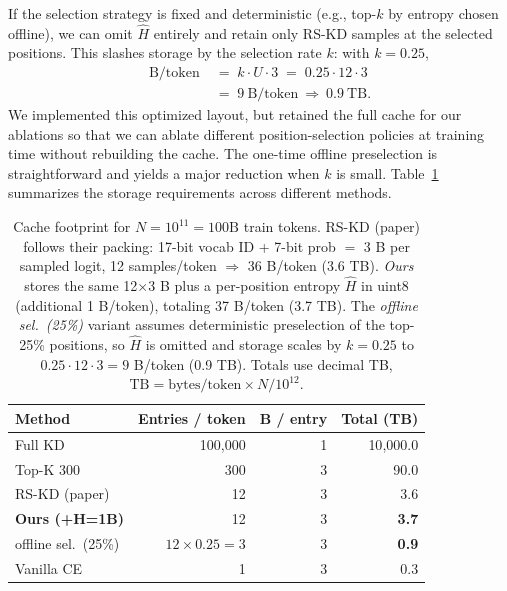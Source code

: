 \documentclass[11pt]{article}
\begin{document}
If the selection strategy is fixed and deterministic (e.g., top-$k$ by entropy chosen offline), we can omit $\hat H$ entirely and retain only RS-KD samples at the selected positions. This slashes storage by the selection rate $k$: with $k{=}0.25$,
\begin{align*}
	\text{B}/\text{token} \; & =\; k \cdot U \cdot 3
	\;=\; 0.25 \cdot 12 \cdot 3                                                              \\
	\;                       & =\; 9~\text{B}/\text{token} \ \Longrightarrow\ 0.9~\text{TB}.
\end{align*}
We implemented this optimized layout, but retained the full cache for our ablations so that we can ablate different position-selection policies at training time without rebuilding the cache. The one-time offline preselection is straightforward and yields a major reduction when $k$ is small.
Table~\ref{tab:storage} summarizes the storage requirements across different methods.


\begin{table}[h]
	\centering
	\begin{adjustbox}{max width=\linewidth}
		\begin{tabular}{lrrr}
			\toprule
			Method                    & Entries / token          & B / entry & Total (TB)   \\
			\midrule
			Full KD                   & 100{,}000                & 1         & 10{,}000.0   \\
			Top-K 300                 & 300                      & 3         & 90.0         \\
			RS-KD (paper)             & 12                       & 3         & 3.6          \\
			\textbf{Ours (+H=1B)}     & 12                       & 3         & \textbf{3.7} \\
			\quad offline sel.~(25\%) & $12 \!\times\! 0.25 = 3$ & 3         & \textbf{0.9} \\
			Vanilla CE                & 1                        & 3         & 0.3          \\
			\bottomrule
		\end{tabular}
	\end{adjustbox}
	\caption{Cache footprint for $N{=}10^{11}{=}100\text{B}$ train tokens. RS-KD (paper) follows their packing: 17-bit vocab ID + 7-bit prob $=$ 3 B per sampled logit, 12 samples/token $\Rightarrow$ 36 B/token (3.6 TB). \textit{Ours} stores the same 12$\times$3 B plus a per-position entropy $\hat H$ in uint8 (additional 1 B/token), totaling 37 B/token (3.7 TB). The \textit{offline sel.~(25\%)} variant assumes deterministic preselection of the top-25\% positions, so $\hat H$ is omitted and storage scales by $k{=}0.25$ to $0.25{\cdot}12{\cdot}3{=}9$ B/token (0.9 TB). Totals use decimal TB, $\mathrm{TB}=\text{bytes/token}\times N/10^{12}$.}
	\label{tab:storage}
\end{table}
\end{document}
